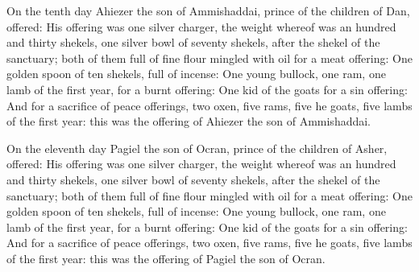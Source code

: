  On the tenth day Ahiezer the son of Ammishaddai, prince
of the children of Dan, offered:  His offering was one
silver charger, the weight whereof was an hundred and thirty shekels,
one silver bowl of seventy shekels, after the shekel of the sanctuary;
both of them full of fine flour mingled with oil for a meat offering:
 One golden spoon of ten shekels, full of incense:
 One young bullock, one ram, one lamb of the first year,
for a burnt offering:  One kid of the goats for a sin
offering:  And for a sacrifice of peace offerings, two
oxen, five rams, five he goats, five lambs of the first year: this was
the offering of Ahiezer the son of Ammishaddai.

 On the eleventh day Pagiel the son of Ocran, prince of
the children of Asher, offered:  His offering was one
silver charger, the weight whereof was an hundred and thirty shekels,
one silver bowl of seventy shekels, after the shekel of the sanctuary;
both of them full of fine flour mingled with oil for a meat offering:
 One golden spoon of ten shekels, full of incense:
 One young bullock, one ram, one lamb of the first year,
for a burnt offering:  One kid of the goats for a sin
offering:  And for a sacrifice of peace offerings, two
oxen, five rams, five he goats, five lambs of the first year: this was
the offering of Pagiel the son of Ocran.

